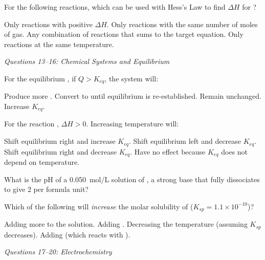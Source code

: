 \documentclass[addpoints]{exam}
\begin{document}
\begin{questions}
\question[1] For the following reactions, which can be used with Hess's Law to find
$\Delta H$ for ?
\begin{choices}
    \choice Only reactions with positive $\Delta H$.
    \choice Only reactions with the same number of moles of gas.
    \correctchoice Any combination of reactions that sums to the target equation.
    \choice Only reactions at the same temperature.
\end{choices}

\vspace{3mm}
\noindent\textit{Questions 13--16: Chemical Systems and Equilibrium}
\vspace{3mm}

\question[1] For the equilibrium , if $Q > K_{eq}$, the system will:
\begin{choices}
    \choice Produce more .
    \correctchoice Convert  to  until equilibrium is re-established.
    \choice Remain unchanged.
    \choice Increase $K_{eq}$.
\end{choices}

\question[1] For the reaction , $\Delta H > 0$.
Increasing temperature will:
\begin{choices}
    \correctchoice Shift equilibrium right and increase $K_{eq}$.
    \choice Shift equilibrium left and decrease $K_{eq}$.
    \choice Shift equilibrium right and decrease $K_{eq}$.
    \choice Have no effect because $K_{eq}$ does not depend on temperature.
\end{choices}

\question[1] What is the pH of a \SI{0.050}{mol/L} solution of , a strong base
that fully dissociates to give 2  per formula unit?
\begin{choices}
\end{choices}

\question[1] Which of the following will \textit{increase} the molar solubility of 
($K_{sp} = 1.1\times10^{-10}$)?
\begin{choices}
    \choice Adding more  to the solution.
    \choice Adding .
    \choice Decreasing the temperature (assuming $K_{sp}$ decreases).
    \correctchoice Adding  (which reacts with ).
\end{choices}

\vspace{3mm}
\noindent\textit{Questions 17--20: Electrochemistry}
\vspace{3mm}


\end{questions}
\end{document}
